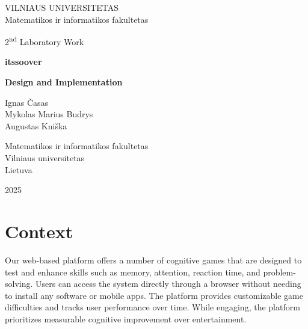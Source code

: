 \documentclass[11pt,a4paper]{article}
\begin{document}

\begin{titlepage}
    \centering
    \thispagestyle{empty}
    
    {\Large VILNIAUS UNIVERSITETAS\\
    Matematikos ir informatikos fakultetas}\par
    
    \vspace{3cm} %
    
    {\Large 2\textsuperscript{nd} Laboratory Work}\par
    \vspace{0.5cm}
    {\Large \textbf{itssoover}}\par
    {\Large \textbf{Design and Implementation}}\par
    
    \vspace{3cm}
    
    {\large
    Ignas Časas\\
    Mykolas Marius Budrys\\
    Augustas Kniška
    }\par
    
    \vspace{8cm}
    
    {\large
    Matematikos ir informatikos fakultetas\\
    Vilniaus universitetas\\
    Lietuva
    }\par
    
    \vfill

    \large 2025
    
\end{titlepage}

\tableofcontents
\newpage

\section{Context}
Our web-based platform offers a number of cognitive games that are designed to test and enhance skills such as memory, attention, reaction time, and problem-solving. Users can access the system directly through a browser without needing to install any software or mobile apps. The platform provides customizable game difficulties and tracks user performance over time. While engaging, the platform prioritizes measurable cognitive improvement over entertainment. 
\end{document}
